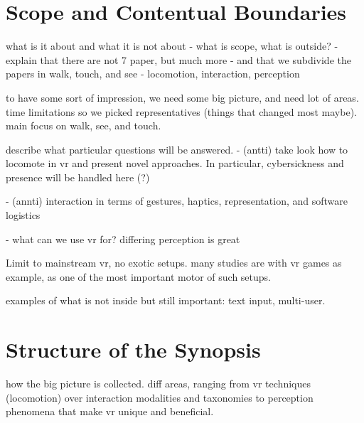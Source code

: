 




\section{Scope and Contentual Boundaries}
what is it about and what it is not about
- what is scope, what is outside?
- explain that there are not 7 paper, but much more
- and that we subdivide the papers in walk, touch, and see - locomotion, interaction, perception






to have some sort of impression, we need some big picture, and need lot of areas. time limitations so we picked representatives (things that changed most maybe). main focus on walk, see, and touch.

describe what particular questions will be answered.
- (antti) take look how to locomote in vr and present novel approaches. In particular, cybersickness and presence will be handled here (?)


- (annti) interaction in terms of gestures, haptics, representation, and software logistics


- what can we use vr for? differing perception is great


Limit to mainstream vr, no exotic setups.
many studies are with vr games as example, as one of the most important motor of such setups.


examples of what is not inside but still important: text input, multi-user.




\section{Structure of the Synopsis}

how the big picture is collected. diff areas, ranging from vr techniques (locomotion) over interaction modalities and taxonomies to perception phenomena that make vr unique and beneficial.



